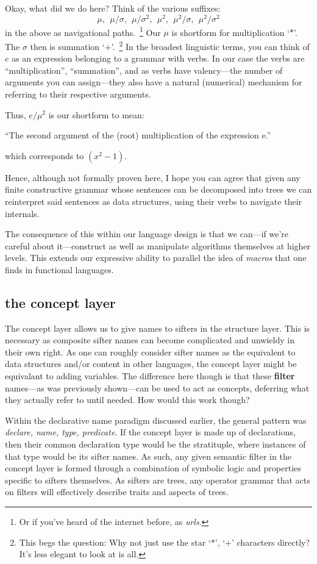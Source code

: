 \documentclass[twoside]{article}
\begin{document}
Okay, what did we do here? Think of the various suffixes:
$$ \mu,\ \ \mu/\sigma,\ \ \mu/\sigma^2,\ \ \mu^2,\ \ \mu^2/\sigma,\ \ \mu^2/\sigma^2 $$
in the above as navigational paths.~\footnote{Or if you've heard of the internet before, as \emph{urls}.}
Our $ \mu $ is shortform for multiplication `$ * $'. The $ \sigma $ then is summation `$ + $'.~\footnote{This
begs the question: Why not just use the star `$ * $', `$ + $' characters directly? It's less elegant to look at is all.}
In the broadest linguistic terms, you can think of $ e $ as an expression belonging to a grammar with verbs. In our case
the verbs are ``multiplication'', ``summation'', and as verbs have valency---the number of arguments you can assign---they
also have a natural (numerical) mechanism for referring to their respective arguments.

Thus, $ e/\mu^2 $ is our shortform to mean:
\begin{center}
``The second argument of the (root) multiplication of the expression e.''
\end{center}
which corresponds to $ (x^2-1) $.

Hence, although not formally proven here, I hope you can agree that given any finite constructive grammar whose sentences
can be decomposed into trees we can reinterpret said sentences as data structures, using their verbs to navigate their internals.

The consequence of this within our language design is that we can---if we're careful about it---construct as well as
manipulate algorithms themselves at higher levels. This extends our expressive ability to parallel the idea of \emph{macros}
that one finds in functional languages.

\subsection*{the concept layer}

The concept layer allows us to give names to sifters in the structure layer. This is necessary as composite sifter names can become
complicated and unwieldy in their own right. As one can roughly consider sifter names as the equivalent to data structures and/or
content in other languages, the concept layer might be equivalant to adding variables. The difference here though is that these
{\bf filter} names---as was previously shown---can be used to act as concepts, deferring what they actually refer to until needed.
How would this work though?

Within the declarative name paradigm discussed earlier, the general pattern was \emph{declare, name, type, predicate}.
If the concept layer is made up of declarations, then their common declaration type would be the stratituple, where instances
of that type would be its sifter names. As such, any given semantic filter in the concept layer is formed through a combination
of symbolic logic and properties specific to sifters themselves. As sifters are trees, any operator grammar that acts on filters
will effectively describe traits and aspects of trees.
\end{document}
